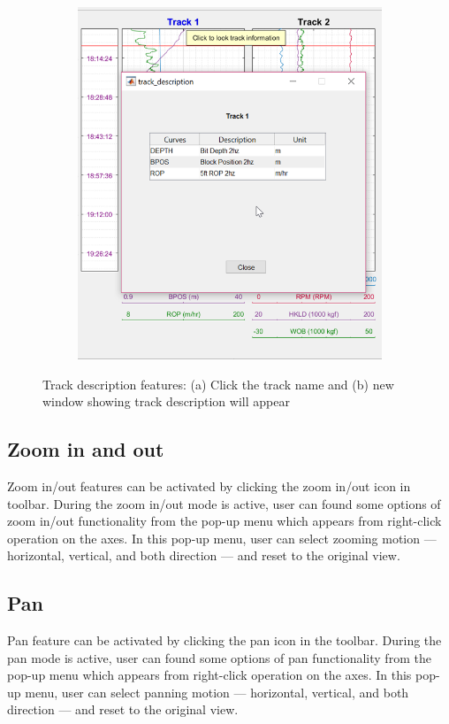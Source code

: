 \documentclass[12pt,a4paper,oneside]{report}
\begin{document}
\begin{figure}[H]
\begin{subfigure}[b]{0.55\textwidth}
    \includegraphics[width=\textwidth]{fig/track_des_2.png}
    \caption{}
  \end{subfigure}
  \caption{Track description features: (a) Click the track name and (b) new window showing track description will appear}
  
\end{figure}



\subsection{Zoom in and out}
Zoom in/out features can be activated by clicking the zoom in/out icon in toolbar. During the zoom in/out mode is active, user can found some options of zoom in/out functionality from the pop-up menu which appears from right-click operation on the axes. In this pop-up menu, user can select zooming motion --- horizontal, vertical, and both direction --- and reset to the original view.

\subsection{Pan}
Pan feature can be activated by clicking the pan icon in the toolbar. During the pan mode is active, user can found some options of pan functionality from the pop-up menu which appears from right-click operation on the axes. In this pop-up menu, user can select panning motion --- horizontal, vertical, and both direction --- and reset to the original view.
\end{document}
